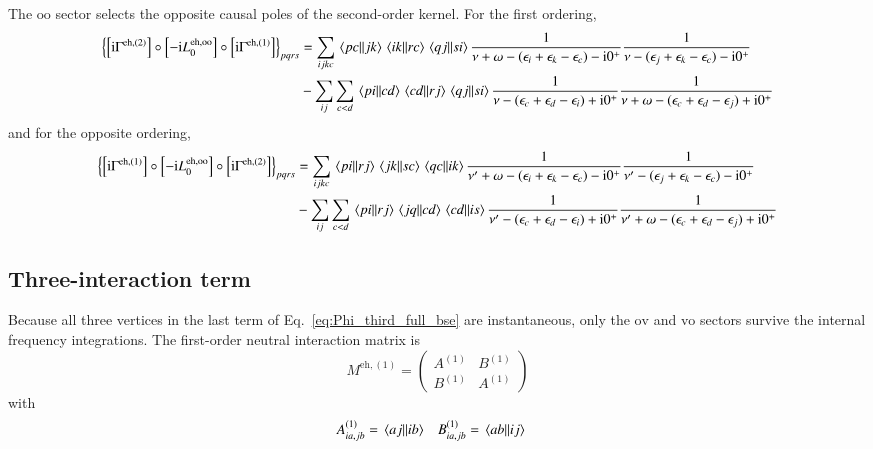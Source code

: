 \documentclass[aip,jcp,reprint,noshowkeys,superscriptaddress]{revtex4-1}
\newcommand{\eps}{\epsilon}
\newcommand{\ii}{\mathrm{i}}
\newcommand{\eh}{\text{eh}}
\begin{document}
The $\text{oo}$ sector selects the opposite causal poles of the second-order kernel.
For the first ordering,
\begin{equation}
    \begin{split}
    \left\{
    \left[\ii\Gamma^{\eh,(2)}\right]
    \circ\left[-\ii L_0^{\eh,\text{oo}}\right]
    \circ\left[\ii\Gamma^{\eh,(1)}\right]
    \right\}_{pqrs}
    & =
    \sum_{ijkc}
    \mel{pc}{}{jk}\mel{ik}{}{rc}\mel{qj}{}{si}
    \frac{1}{\nu+\omega-(\eps_i+\eps_k-\eps_c)-\ii0^+}
    \frac{1}{\nu-(\eps_j+\eps_k-\eps_c)-\ii0^+}
    \\
    &-
    \sum_{ij}\sum_{c<d}
    \mel{pi}{}{cd}\mel{cd}{}{rj}\mel{qj}{}{si}
    \frac{1}{\nu-(\eps_c+\eps_d-\eps_i)+\ii0^+}
    \frac{1}{\nu+\omega-(\eps_c+\eps_d-\eps_j)+\ii0^+}
    \end{split}
    \label{eq:Phi_eh_third_oo_left}
\end{equation}
and for the opposite ordering,
\begin{equation}
    \begin{split}
    \left\{
    \left[\ii\Gamma^{\eh,(1)}\right]
    \circ\left[-\ii L_0^{\eh,\text{oo}}\right]
    \circ\left[\ii\Gamma^{\eh,(2)}\right]
    \right\}_{pqrs}
    & =
    \sum_{ijkc}
    \mel{pi}{}{rj}\mel{jk}{}{sc}\mel{qc}{}{ik}
    \frac{1}{\nu'+\omega-(\eps_i+\eps_k-\eps_c)-\ii0^+}
    \frac{1}{\nu'-(\eps_j+\eps_k-\eps_c)-\ii0^+}
    \\
    &-
    \sum_{ij}\sum_{c<d}
    \mel{pi}{}{rj}\mel{jq}{}{cd}\mel{cd}{}{is}
    \frac{1}{\nu'-(\eps_c+\eps_d-\eps_i)+\ii0^+}
    \frac{1}{\nu'+\omega-(\eps_c+\eps_d-\eps_j)+\ii0^+}
    \end{split}
    \label{eq:Phi_eh_third_oo_right}
\end{equation}

\subsection{Three-interaction term}

Because all three vertices in the last term of
Eq.~\eqref{eq:Phi_third_full_bse} are instantaneous, only the $\text{ov}$ and
$\text{vo}$ sectors survive the internal frequency integrations.
The first-order neutral interaction matrix is
\begin{equation}
    M^{\eh,(1)}
    =
    \begin{pmatrix}
    A^{(1)}&B^{(1)}
    \\
    B^{(1)}&A^{(1)}
    \end{pmatrix}
    \label{eq:M_eh_first}
\end{equation}
with
\begin{align}
    A^{(1)}_{ia,jb}
    &=
    \mel{aj}{}{ib}
    &
    B^{(1)}_{ia,jb}
    &=
    \mel{ab}{}{ij}
\end{align}
\end{document}
